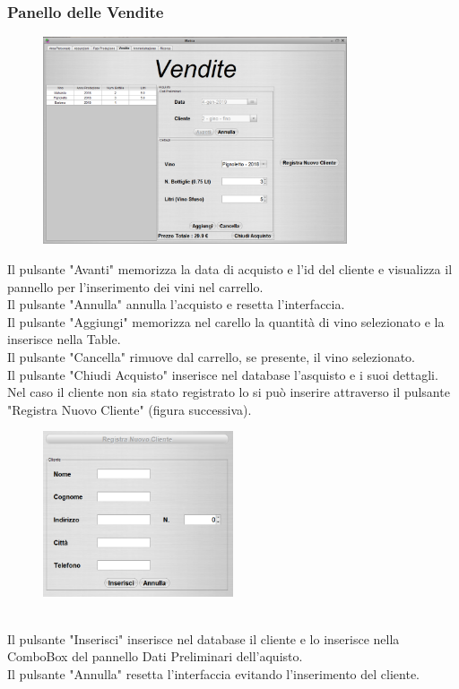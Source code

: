 \documentclass{article}
\begin{document}
\subsubsection{Panello delle Vendite}
\begin{figure}[htbp]
\centering
\includegraphics[width=0.8\textwidth]{img/panel_vendite.png}
\end{figure}
Il pulsante "Avanti" memorizza la data di acquisto e l'id del cliente e visualizza il pannello per l'inserimento dei vini nel carrello.\\
Il pulsante "Annulla" annulla l'acquisto e resetta l'interfaccia.\\
Il pulsante "Aggiungi" memorizza nel carello la quantità di vino selezionato e la inserisce nella Table.\\
Il pulsante "Cancella" rimuove dal carrello, se presente,  il vino selezionato.\\
Il pulsante "Chiudi Acquisto" inserisce nel database l'asquisto e i suoi dettagli.\\
\newline
Nel caso il cliente non sia stato registrato lo si può inserire attraverso il pulsante "Registra Nuovo Cliente" (figura successiva).\\
\begin{figure}[htbp]
\centering
\includegraphics[width=0.5\textwidth]{img/panel_client.png}
\end{figure}\\
Il pulsante "Inserisci" inserisce nel database il cliente e lo inserisce nella ComboBox del pannello Dati Preliminari dell'aquisto.\\
Il pulsante "Annulla" resetta l'interfaccia evitando l'inserimento del cliente.\\
\newpage
\end{document}
